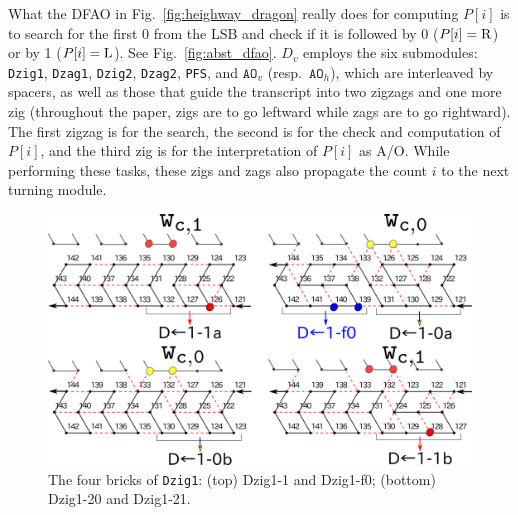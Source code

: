 \documentclass[runningheads]{llncs}
\begin{document}
What the DFAO in Fig.~\ref{fig:heighway_dragon} really does for computing $P[i]$ is to search for the first 0 from the LSB and check if it is followed by 0 ($P[i] = {\rm R}$) or by 1 ($P[i] = {\rm L}$). 
See Fig.~\ref{fig:abst_dfao}. 
$D_v$ employs the six submodules: {\tt Dzig1}, \texttt{Dzag1}, \texttt{Dzig2}, \texttt{Dzag2}, \texttt{PFS}, and $\mathtt{AO}_v$ (resp.~$\mathtt{AO}_h$), which are interleaved by spacers, as well as those that guide the transcript into two zigzags and one more zig (throughout the paper, zigs are to go leftward while zags are to go rightward). 
The first zigzag is for the search, the second is for the check and computation of $P[i]$, and the third zig is for the interpretation of $P[i]$ as A/O. 
While performing these tasks, these zigs and zags also propagate the count $i$ to the next turning module. 

\begin{figure}
\vspace*{-5mm}
\centering
\includegraphics[width=\linewidth]{Figs/DFAO-zig1.png}  
\caption{The four bricks of \texttt{Dzig1}: (top) Dzig1-1 and Dzig1-f0; (bottom) Dzig1-20 and Dzig1-21.}
\label{fig:DFAO-zig1}
\vspace*{-3mm}
\end{figure}
\end{document}
